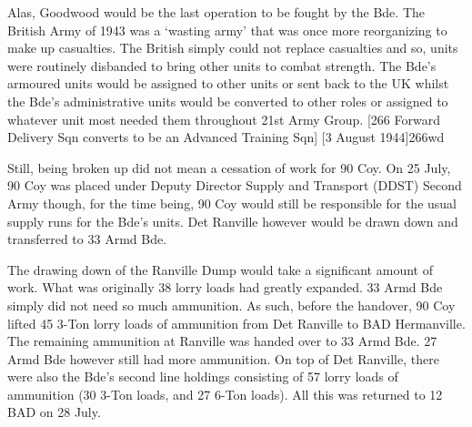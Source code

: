 \documentclass[noraggedright]{turabian-researchpaper}
\begin{document}
Alas, Goodwood would be the last operation to be fought by the Bde.  The 
British Army of 1943 was a `wasting army' that was once more reorganizing to
make up casualties.  The British simply could not replace casualties and so,
units were routinely disbanded to bring other units to combat 
strength.\autocite[Discussion in the latter pages is principly focused on the 
disbanding of infantry formations however, discussion on manpower issues in 
the RAC in the earlier pages leads one to belive that it is likely that the 
same was done for armoured units.][56-60]{cracks}
The Bde's armoured units would be assigned to other units or sent back to the
UK whilst the Bde's administrative units would be converted to other roles
or assigned to whatever unit most needed them throughout 21st Army 
Group.\autocites[90 Coy joins 22 Transport Column][31 July 1944]{90wd}
[For the Regiments][23 July 1944]{27wd} %
[27 Armd Bde Sigs Sqn was disbanded and its men being posted to different 
units piecemeal][August 1944]{27sigs}
[27 Armd Bde's Ordance Field Park was assigned to 2 Armd Replacement Gp]
[24 July 1944]{27ofp}
[27 Armd Bde's REME Workshops are reassigned to the Armd Replacement Gp]
[25 July 1944]{27reme}
[266 Forward Delivery Sqn converts to be an Advanced Training Sqn]
[3 August 1944]{266wd}


Still, being broken up did not mean a cessation of work for 90 Coy.   On 25 
July, 90 Coy was placed under Deputy Director Supply and Transport (DDST) 
Second Army though, for the time being, 90 Coy would still be responsible for 
the usual supply runs for the Bde's units.\autocite[25 July 1944]{90wd}
Det Ranville however would be drawn down and transferred to 33 Armd 
Bde.\autocite[26 July 1944]{90wd}

The drawing down of the Ranville Dump would take a significant amount
of work.  What was originally 38 lorry loads had greatly expanded.  33 Armd 
Bde simply did not need so much ammunition.  As such, before the handover, 90 
Coy lifted 45 3-Ton lorry loads of ammunition from Det Ranville to BAD 
Hermanville.\autocite[25 July 1944]{90wd}  
The remaining ammunition at Ranville was handed over to 33 Armd 
Bde.\autocite[26 July 1944]{90wd}
27 Armd Bde however still had more ammunition.  On top of Det Ranville, 
there were also the Bde's second line holdings consisting of 57 lorry loads of
ammunition (30 3-Ton loads, and 27 6-Ton loads).  All this was returned to 12 
BAD on 28 July.\autocite[28 July 1944]{90wd}
\end{document}
